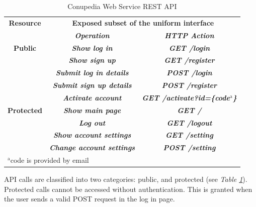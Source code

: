 \documentclass[conference]{IEEEtran}
\begin{document}
            \begin{table}[H]
                \caption{Conupedia Web Service REST API}
                \begin{center}
                \begin{tabular}{|c|c|c|}
                \hline
                \textbf{Resource}& \multicolumn{2}{|c|}{\textbf{Exposed subset of the uniform interface}}\\
                \cline{2-3} 
                \textbf{} & \textbf{\textit{Operation}}& \textbf{\textit{HTTP Action}}\\
                \cline{1-3} 
                \textbf{Public} & \textbf{\textit{Show log in}}& \textbf{\textit{GET /login }}\\
                \textbf{} & \textbf{\textit{Show sign up}}& \textbf{\textit{GET /register }}\\
                \textbf{} & \textbf{\textit{Submit log in details}}& \textbf{\textit{POST /login }}\\
                \textbf{} & \textbf{\textit{Submit sign up details}}& \textbf{\textit{POST /register }}\\
                \textbf{} & \textbf{\textit{Activate account}}& \textbf{\textit{GET /activate?id=\{code$^{\mathrm{a}}$\} }}\\
                \cline{1-3} 
                \textbf{Protected} & \textbf{\textit{Show main page}}& \textbf{\textit{GET / }}\\
                \textbf{} & \textbf{\textit{Log out}}& \textbf{\textit{GET /logout }}\\
                \textbf{} & \textbf{\textit{Show account settings}}& \textbf{\textit{GET /setting }}\\
                \textbf{} & \textbf{\textit{Change account settings}}& \textbf{\textit{POST /setting }}\\
                \hline
                \multicolumn{3}{l}{$^{\mathrm{a}}$code is provided by email}\\
                \end{tabular}
                \label{tab2}
                \end{center}
            \end{table}
        
    
            API calls are classified into two categories: public, and protected (see \textit{Table \ref{tab2}}).
            Protected calls cannot be accessed without authentication.
            This is granted when the user sends a valid POST request in the log in page.
            
\end{document}
